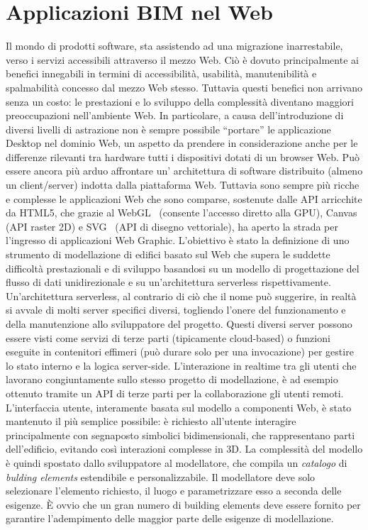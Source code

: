 
\section{Applicazioni BIM nel Web}
\label{sec:chapter_1_section_3}

Il mondo di prodotti software, sta assistendo ad una migrazione inarrestabile, verso i servizi accessibili
attraverso il mezzo Web. Ciò è dovuto principalmente ai benefici innegabili in termini di accessibilità, usabilità,
manutenibilità e spalmabilità concesso dal mezzo Web stesso.
Tuttavia questi benefici non arrivano senza un costo: le prestazioni e lo sviluppo della complessità diventano
maggiori preoccupazioni nell'ambiente Web.
In particolare, a causa dell'introduzione di diversi livelli di astrazione non è sempre possibile ``portare'' le
applicazione Desktop nel dominio Web, un aspetto da prendere in considerazione anche per le differenze rilevanti
tra hardware tutti i dispositivi dotati di un browser Web.
Può essere ancora più arduo affrontare un' architettura di software distribuito (almeno un client/server)
indotta dalla piattaforma Web. Tuttavia sono sempre più ricche e complesse le applicazioni Web che sono comparse,
sostenute dalle API arricchite da HTML5, che grazie al WebGL~\cite{webgl}
(consente l'accesso diretto alla GPU), Canvas~\cite{Munro:15:HCC} (API raster 2D) e SVG~\cite{Jackson:11:SVG}
(API di disegno vettoriale), ha aperto la strada per l'ingresso di applicazioni Web Graphic.
L'obiettivo è stato la definizione di uno strumento di modellazione di edifici basato sul Web
che supera le suddette difficoltà prestazionali e di sviluppo basandosi su un modello di progettazione del flusso di dati
unidirezionale e su un'architettura serverless rispettivamente.
Un'architettura serverless, al contrario di ciò che il nome può suggerire, in realtà si avvale di molti server specifici
diversi, togliendo l'onere del funzionamento e della manutenzione allo sviluppatore del progetto.
Questi diversi server possono essere visti come servizi di terze parti (tipicamente cloud-based) o funzioni eseguite
in contenitori effimeri (può durare solo per una invocazione) per gestire lo stato interno e la logica server-side.
L'interazione in realtime tra gli utenti che lavorano congiuntamente sullo stesso progetto di modellazione,
è ad esempio ottenuto tramite un API di terze parti per la collaborazione gli utenti remoti.
L'interfaccia utente, interamente basata sul modello a componenti Web, è stato mantenuto il più semplice possibile:
è richiesto all'utente interagire principalmente con segnaposto simbolici bidimensionali, che rappresentano parti dell'edificio,
evitando così interazioni complesse in 3D.
La complessità del modello è quindi spostato dallo sviluppatore al modellatore, che compila un \emph{catalogo} di
\emph{bulding elements} estendibile e personalizzabile. Il modellatore deve solo selezionare l'elemento richiesto,
il luogo e parametrizzare esso a seconda delle esigenze. È ovvio che un gran numero di building elements deve essere fornito
per garantire l'adempimento delle maggior parte delle esigenze di modellazione.\\

